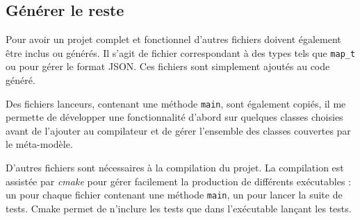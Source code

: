 \subsection{Générer le reste}

Pour avoir un projet complet et fonctionnel d'autres fichiers doivent également être inclus ou générés. Il s'agit de fichier correspondant à des types tels que \texttt{map\_t} ou pour gérer le format JSON. Ces fichiers sont simplement ajoutés au code généré.

Des fichiers lanceurs, contenant une méthode \texttt{main}, sont également copiés, il me permette de développer une fonctionnalité d'abord sur quelques classes choisies avant de l'ajouter au compilateur et de gérer l'ensemble des classes couvertes par le méta-modèle.

D'autres fichiers sont nécessaires à la compilation du projet. La compilation est assistée par \emph{cmake}\cite{cmake} pour gérer facilement la production de différents exécutables : un pour chaque fichier contenant une méthode \texttt{main}, un pour lancer la suite de tests. Cmake permet de n'inclure les tests que dans l'exécutable lançant les tests.